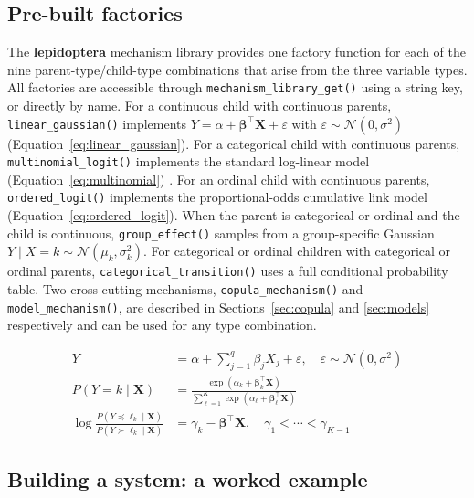 \documentclass[12pt]{article}
\newcommand{\pkg}[1]{\textbf{#1}}
\newcommand{\fct}[1]{\texttt{#1()}}
\begin{document}
\subsection{Pre-built factories}

The \pkg{lepidoptera} mechanism library provides one factory function for each of
the nine parent-type/child-type combinations that arise from the three variable
types. All factories are accessible through \fct{mechanism\_library\_get} using a
string key, or directly by name. For a continuous child with continuous parents,
\fct{linear\_gaussian} implements
$Y = \alpha + \boldsymbol\beta^\top \mathbf{X} + \varepsilon$ with
$\varepsilon \sim \mathcal{N}(0, \sigma^2)$
(Equation~\ref{eq:linear_gaussian}).
For a categorical child with continuous parents, \fct{multinomial\_logit}
implements the standard log-linear model
(Equation~\ref{eq:multinomial}) \citep{agresti2002categorical}.
For an ordinal child with continuous parents, \fct{ordered\_logit} implements the
proportional-odds cumulative link model \citep{mccullagh1980regression}
(Equation~\ref{eq:ordered_logit}).
When the parent is categorical or ordinal and the child is continuous,
\fct{group\_effect} samples from a group-specific Gaussian
$Y \mid X = k \sim \mathcal{N}(\mu_k, \sigma_k^2)$.
For categorical or ordinal children with categorical or ordinal parents,
\fct{categorical\_transition} uses a full conditional probability table. Two
cross-cutting mechanisms, \fct{copula\_mechanism} and \fct{model\_mechanism},
are described in Sections~\ref{sec:copula} and \ref{sec:models} respectively and can
be used for any type combination.

\begin{align}
Y &= \alpha + \sum_{j=1}^q \beta_j X_j + \varepsilon, \quad
     \varepsilon \sim \mathcal{N}(0,\sigma^2) \label{eq:linear_gaussian} \\[4pt]
P(Y = k \mid \mathbf{X}) &= \frac{\exp(\alpha_k + \boldsymbol\beta_k^\top\mathbf{X})}
     {\sum_{\ell=1}^K \exp(\alpha_\ell + \boldsymbol\beta_\ell^\top\mathbf{X})}
     \label{eq:multinomial} \\[4pt]
\log\frac{P(Y \preceq \ell_k \mid \mathbf{X})}{P(Y \succ \ell_k \mid \mathbf{X})}
     &= \gamma_k - \boldsymbol\beta^\top\mathbf{X}, \quad
     \gamma_1 < \cdots < \gamma_{K-1} \label{eq:ordered_logit}
\end{align}

\subsection{Building a system: a worked example}
\end{document}
